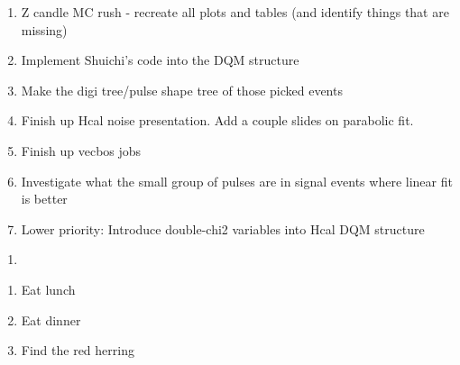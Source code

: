 

\begin{enumerate}
\item Z candle MC rush - recreate all plots and tables (and identify things that are missing)
\item Implement Shuichi's code into the DQM structure
\item Make the digi tree/pulse shape tree of those picked events
\item Finish up Hcal noise presentation.  Add a couple slides on parabolic fit.
\item Finish up vecbos jobs
\item Investigate what the small group of pulses are in signal events where linear fit is better
\item Lower priority: Introduce double-chi2 variables into Hcal DQM structure
\end{enumerate}


\begin{enumerate}
\item 
\end{enumerate}



\begin{enumerate}
\item Eat lunch
\item Eat dinner
\item Find the red herring
\end{enumerate}


